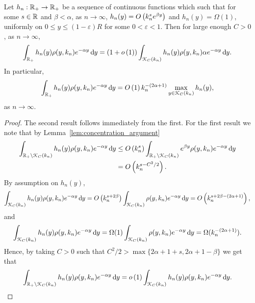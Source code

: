 \begin{appendices}
\begin{corollary}\label{cor:concentration_heights_bounds_n}
Let $h_n : {\mathbb R}_+ \to {\ensuremath{\mathbb R}}_+$ be a sequence of continuous functions which such that for some $s \in {\ensuremath{\mathbb R}}$ and $\beta < \alpha$, as $n \to \infty$, $h_n(y) = O\left(k_n^{s} e^{\beta y}\right)$ and $h_n(y) = \Omega(1)$, uniformly on $0 \le y \le (1-\varepsilon)R$ for some $0 < \varepsilon < 1$. Then for large enough $C > 0$, as $n \to \infty$,
\[
	\int_{{\mathbb R}_+} h_n(y) \rho(y,k_n) e^{-\alpha y} \operatorname{\mathrm{d}\hspace{-2pt}} y 
	= (1 + o\left(1\right)) \int_{{\mathcal K}_{C}(k_n)} h_n(y) \rho(y,k_n) \alpha e^{-\alpha y} \operatorname{\mathrm{d}\hspace{-2pt}} y.
\]
In particular,
\[
	\int_{{\mathbb R}_+} h_n(y) \rho(y,k_n) e^{-\alpha y} \operatorname{\mathrm{d}\hspace{-2pt}} y = O\left(1\right) k_n^{-(2\alpha + 1)} \max_{y \in {\mathcal K}_{C}(k_n)} h_n(y),
\]
as $n \to \infty$.
\end{corollary}

\begin{proof}
The second result follows immediately from the first. For the first result we note that by Lemma~\ref{lem:concentration_argument}
\begin{align*}
	\int_{{\mathbb R}_+ \setminus {\mathcal K}_C(k_n)} h_n(y) \rho(y,k_n) e^{-\alpha y} \operatorname{\mathrm{d}\hspace{-2pt}} y
	&\le O\left(k_n^s\right) \int_{{\mathbb R}_+ \setminus {\mathcal K}_C(k_n)} e^{\beta y } \rho(y,k_n) e^{-\alpha y} \operatorname{\mathrm{d}\hspace{-2pt}} y\\
	&= O\left(k_n^{s - C^2/2}\right).
\end{align*}
By assumption on $h_n(y)$,
\[
	\int_{{\mathcal K}_{C}(k_n)} h_n(y) \rho(y,k_n) e^{-\alpha y} \operatorname{\mathrm{d}\hspace{-2pt}} y 
	= O\left(k_n^{s+2\beta}\right) \int_{{\mathcal K}_{C}(k_n)} \rho(y,k_n) e^{-\alpha y} \operatorname{\mathrm{d}\hspace{-2pt}} y
	= O\left(k_n^{s+2\beta - (2\alpha + 1)}\right),
\]
and
\[
	\int_{{\mathcal K}_{C}(k_n)} h_n(y) \rho(y,k_n) e^{-\alpha y} \operatorname{\mathrm{d}\hspace{-2pt}} y 
	= \Omega(1) \int_{{\mathcal K}_{C}(k_n)} \rho(y,k_n) e^{-\alpha y} \operatorname{\mathrm{d}\hspace{-2pt}} y
	= \Omega(k_n^{-(2\alpha + 1)}).
\]
Hence, by taking $C > 0$ such that $C^2/2 > \max\{2\alpha + 1 + s, 2\alpha +1 - \beta\}$ we get that
\[
	\int_{{\mathbb R}_+ \setminus {\mathcal K}_C(k_n)} h_n(y) \rho(y,k_n) e^{-\alpha y} \operatorname{\mathrm{d}\hspace{-2pt}} y
	= o\left(1\right) \int_{{\mathcal K}_{C}(k_n)} h_n(y) \rho(y,k_n) e^{-\alpha y} \operatorname{\mathrm{d}\hspace{-2pt}} y.
\]
\end{proof}



\end{appendices}
